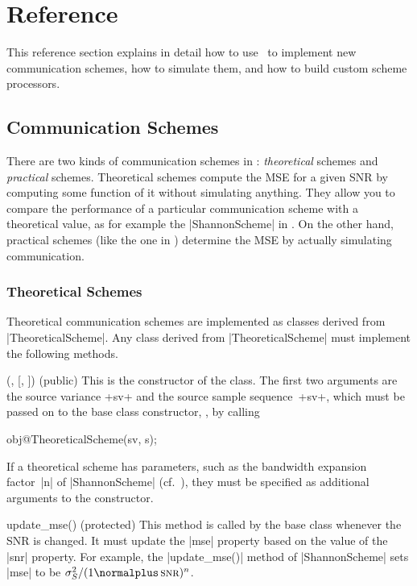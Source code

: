 \section{Reference}\label{sec:reference}

This reference section explains in detail how to use \jscsim\ to implement new
communication schemes, how to simulate them, and how to build custom scheme
processors. 


\subsection{Communication Schemes}

There are two kinds of communication schemes in \jscsim: \emph{theoretical}
schemes and \emph{practical} schemes. Theoretical schemes compute the MSE for a
given SNR by computing some function of it without simulating anything. They
allow you to compare the performance of a particular communication scheme with a
theoretical value, as for example the |ShannonScheme| in .
On the other hand, practical schemes (like the one in )
determine the MSE by actually simulating communication.


\subsubsection{Theoretical Schemes}

Theoretical communication schemes are implemented as classes derived from
|TheoreticalScheme|. Any class derived from |TheoreticalScheme| must implement
the following methods.

\begin{method}{(, 
  [, ]) (public)}
  This is the constructor of the class. The first two arguments are the source
  variance +sv+ and the source sample sequence~+sv+, which must be passed on to
  the base class constructor, \ie, by calling
  \begin{Code}
  obj@TheoreticalScheme(sv, s);
  \end{Code}

  If a theoretical scheme has parameters, such as the bandwidth expansion
  factor~|n| of |ShannonScheme| (cf.~), they must be
  specified as additional arguments to the constructor.
\end{method}

\begin{method}{update_mse(\obj) (protected)}
    This method is called by the base class whenever the SNR is changed. It
    must update the |mse| property based on the value of the |snr| property.
    For example, the |update_mse()| method of |ShannonScheme| sets |mse| to be
    $\ssq / (1 \normalplus \snr)^n$.
\end{method}


